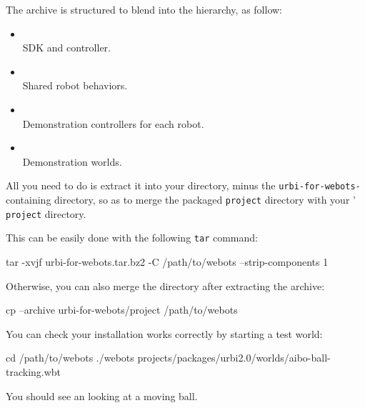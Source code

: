 The archive is structured to blend into the \webots hierarchy, as
follow:

\begin{itemize}
\item {}\\ \urbi{} SDK and
  \webots{} controller.
\item {}\\ Shared
  \us{} robot behaviors.
\item {}\\
  Demonstration controllers for each robot.
\item {}\\ Demonstration
  worlds.
\end{itemize}

All you need to do is extract it into your \webots directory, minus the
\texttt{urbi-for-webots-} containing directory, so as to
merge the packaged \texttt{project} directory with your \webots{}'
\texttt{project} directory.

This can be easily done with the following \texttt{tar} command:

\begin{shell}
tar -xvjf urbi-for-webots.tar.bz2 -C /path/to/webots --strip-components 1
\end{shell}

Otherwise, you can also merge the directory after extracting the archive:

\begin{shell}
cp --archive urbi-for-webots/project /path/to/webots
\end{shell}

You can check your installation works correctly by starting a test world:

\begin{shell}
cd /path/to/webots
./webots projects/packages/urbi2.0/worlds/aibo-ball-tracking.wbt
\end{shell}

You should see an \aibo{} looking at a moving ball.

\subsubsection{\macosx{}}

